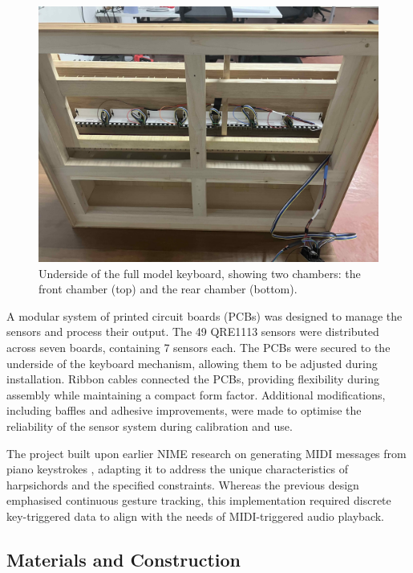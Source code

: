 \begin{figure}  
  \centering
  \includegraphics[width=\linewidth]{src/images/49-key-bottom-sensors-no-keys.jpg} 
  \caption{Underside of the full model keyboard, showing two chambers: the front chamber (top) and the rear chamber (bottom).} 
  \Description{} 
  \label{fig:49-key-bottom}
\end{figure}

A modular system of printed circuit boards (PCBs) was designed to manage the sensors and process their output. The 49 QRE1113 sensors were distributed across seven boards, containing 7 sensors each. The PCBs were secured to the underside of the keyboard mechanism, allowing them to be adjusted during installation. Ribbon cables connected the PCBs, providing flexibility during assembly while maintaining a compact form factor. Additional modifications, including baffles and adhesive improvements, were made to optimise the reliability of the sensor system during calibration and use.


The project built upon earlier NIME research on generating MIDI messages from piano keystrokes \cite{McPherson2013}, adapting it to address the unique characteristics of harpsichords and the specified constraints. Whereas the previous design emphasised continuous gesture tracking, this implementation required discrete key-triggered data to align with the needs of MIDI-triggered audio playback. 


\subsection{Materials and Construction}

